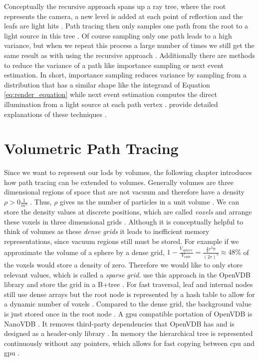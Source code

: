 Conceptually the recursive approach spans up a ray tree, where the root represents the camera, a new level is added at each point of reflection and the leafs are light hits \cite{rendering_equation}.
Path tracing then only samples one path from the root to a light source in this tree \cite{rendering_equation}.
Of course sampling only one path leads to a high variance, but when we repeat this process a large number of times we still get the same result as with using the recursive approach \cite{pbr}.
Additionally there are methods to reduce the variance of a path like importance sampling or next event estimation.
In short, importance sampling reduces variance by sampling from a distribution that has a similar shape like the integrand of Equation \ref{eq:render_equation} while next event estimation computes the direct illumination from a light source at each path vertex \cite{pbr}.
\citeauthor{pbr} provide detailed explanations of these techniques \cite{pbr}.

\section{Volumetric Path Tracing}
Since we want to represent our \acsp{lod} by volumes, the following chapter introduces how path tracing can be extended to volumes.
Generally volumes are three dimensional regions of space that are not vacuum and therefore have a density $\rho > 0 \frac{1}{m^3}$ \cite{pbr}.
Thus, $\rho$ gives us the number of particles in a unit volume \cite{novak_overview}.
We can store the density values at discrete positions, which are called \textit{voxels} and arrange these voxels in three dimensional grids \cite{pbr}.
Although it is conceptually helpful to think of volumes as these \textit{dense grids} it leads to inefficient memory representations, since vacuum regions still must be stored.
For example if we approximate the volume of a sphere by a dense grid, $1 - \frac{V_{sphere}}{V_{cube}} = \frac{\frac{4}{3}r^3\pi}{(2r)^3}\approx 48\%$ of the voxels would store a density of zero.
Therefore we would like to only store relevant values, which is called a \textit{sparse grid}.
\citeauthor{museth_vdb} use this approach in the OpenVDB library and store the grid in a B+tree \cite{museth_vdb}.
For fast traversal, leaf and internal nodes still use dense arrays but the root node is represented by a hash table to allow for a dynamic number of voxels \cite{museth_vdb}.
Compared to the dense grid, the background value is just stored once in the root node \cite{museth_vdb}.
A \ac{gpu} compatible portation of OpenVDB is NanoVDB \cite{museth_nanovdb}.
It removes third-party dependencies that OpenVDB has and is designed as a header-only library \cite{museth_nanovdb}.
In memory the hierarchical tree is represented continuously without any pointers, which allows for fast copying between \ac{cpu} and \ac{gpu} \cite{museth_nanovdb}.

